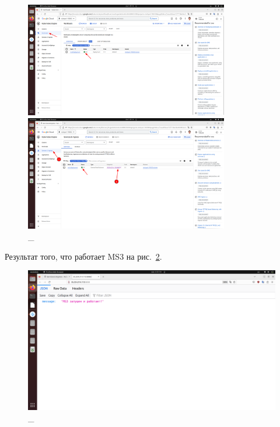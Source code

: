 \documentclass[12pt, a4paper, simple]{eskdtext}
\begin{document}
  \begin{figure}[!h]
    \centering

    \begin{minipage}{0.49\textwidth}
      \centering

      \includegraphics[height=5cm]
      {images/2023-03-03_01-18-40.png}

      \caption{\_}

      \label{fig:5}
    \end{minipage}
    \begin{minipage}{0.49\textwidth}
      \centering

      \includegraphics[height=5cm]
      {images/2023-03-03_01-19-13.png}

      \caption{\_}

      \label{fig:6}
    \end{minipage}
  \end{figure}

  Результат того, что работает MS3 на рис.~\ref{fig:7}.

  \begin{figure}[!h]
    \centering
    \includegraphics[width=18cm]
    {images/2023-03-03_01-19-42.png}
    \caption{\_}
    \label{fig:7}
  \end{figure}
\end{document}

